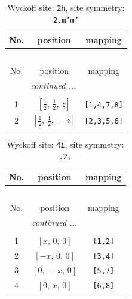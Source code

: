 \documentclass[fleqn,8pt]{jsarticle}
\begin{document}
\begin{longtable}{ccc}
\caption{Wyckoff site: {\tt 2h}, site symmetry: {\tt 2.m'm'}}
 \\
 \hline \hline
No. & position & mapping \\ \hline \endfirsthead

\multicolumn{2}{l}{\tablename\ \thetable{}} \\
 \hline \hline
No. & position & mapping \\ \hline \endhead

 \hline \hline
\multicolumn{2}{r}{\footnotesize\it continued ...} \\ \endfoot

 \hline \hline
\multicolumn{2}{r}{} \\ \endlastfoot

1 & $\left[ \frac{1}{2},\, \frac{1}{2},\, z \right]$ & {\tt [1,4,7,8]} \\ \hline
2 & $\left[ \frac{1}{2},\, \frac{1}{2},\, - z \right]$ & {\tt [2,3,5,6]} \\
\end{longtable}
\renewcommand{\arraystretch}{1.2}
\begin{longtable}{ccc}
\caption{Wyckoff site: {\tt 4i}, site symmetry: {\tt .2.}}
 \\
 \hline \hline
No. & position & mapping \\ \hline \endfirsthead

\multicolumn{2}{l}{\tablename\ \thetable{}} \\
 \hline \hline
No. & position & mapping \\ \hline \endhead

 \hline \hline
\multicolumn{2}{r}{\footnotesize\it continued ...} \\ \endfoot

 \hline \hline
\multicolumn{2}{r}{} \\ \endlastfoot

1 & $\left[ x,\, 0,\, 0 \right]$ & {\tt [1,2]} \\ \hline
2 & $\left[ - x,\, 0,\, 0 \right]$ & {\tt [3,4]} \\ \hline
3 & $\left[ 0,\, - x,\, 0 \right]$ & {\tt [5,7]} \\ \hline
4 & $\left[ 0,\, x,\, 0 \right]$ & {\tt [6,8]} \\
\end{longtable}
\renewcommand{\arraystretch}{1.2}
\end{document}

